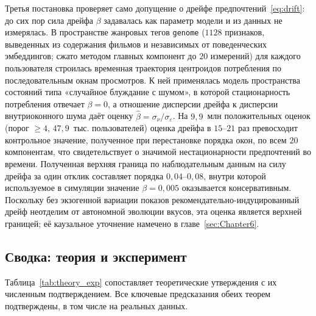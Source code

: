 Третья постановка проверяет само допущение о дрейфе предпочтений~\eqref{eq:drift}:
до сих пор сила дрейфа $\beta$ задавалась как параметр модели и из данных не
измерялась. В пространстве жанровых тегов \texttt{genome} ($1128$ признаков,
выведенных из содержания фильмов и независимых от поведенческих эмбеддингов;
сжато методом главных компонент до $20$ измерений) для каждого пользователя
строилась временная траектория центроидов потребления по последовательным окнам
просмотров. К ней применялась модель пространства состояний типа «случайное
блуждание с шумом», в которой стационарность потребления отвечает $\beta=0$, а
отношение дисперсии дрейфа к дисперсии внутриоконного шума даёт оценку
$\hat\beta=\sigma_\nu/\sigma_\varepsilon$. На $9{,}9$~млн положительных оценок
(порог $\ge 4$, $47{,}9$~тыс. пользователей) оценка дрейфа в $15$--$21$ раз
превосходит контрольное значение, полученное при перестановке порядка окон, по
всем $20$ компонентам, что свидетельствует о значимой нестационарности
предпочтений во времени. Полученная верхняя граница по наблюдательным данным на силу
дрейфа за один отклик составляет порядка $0{,}04$--$0{,}08$, внутри которой
используемое в симуляции значение $\beta=0{,}005$ оказывается консервативным.
Поскольку без экзогенной вариации показов рекомендательно-индуцированный
дрейф неотделим от автономной эволюции вкусов, эта оценка является верхней
границей; её каузальное уточнение намечено в главе~\ref{sec:Chapter6}.

\subsection{Сводка: теория и эксперимент}
\label{subsec:exp_summary}

Таблица~\ref{tab:theory_exp} сопоставляет теоретические утверждения с их
численным подтверждением. Все ключевые предсказания обеих теорем подтверждены,
в том числе на реальных данных.

